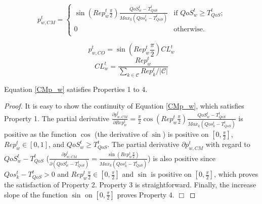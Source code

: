 \begin{equation} \label{CMp_w}
p_{w,CM}^t = \begin{cases}
\sin(Rep^t_w\frac{\pi}{2})\frac{QoS_w^t-T_{QoS}^t}{Max_k(Qos_k^t-T_{QoS}^t)} & \text{if $QoS_w^t\geq T_{QoS}^t$;}\\
0 & \text{otherwise.}\\
\end{cases}
\end{equation}

\begin{equation}\label{CLp_w}
p_{w,CO}^t=\sin(Rep^t_w\frac{\pi}{2})CL_w^t
\end{equation}
\begin{equation*}
CL_w^t=\frac{Rep^t_w}{\sum_{k\in
\mathcal{C}}Rep^t_k/|\mathcal{C}|}
\end{equation*}

\begin{theorem}
Equation  \ref{CMp_w} satisfies Properties 1 to 4.
\end{theorem}

\begin{proof}
It is easy to show the continuity of Equation \ref{CMp_w}, which
satisfies Property 1. The partial derivative $\frac{\partial
p_{w,CM}^t}{\partial Rep^t_w} = \frac{\pi}{2}
\cos(Rep^t_w\frac{\pi}{2})\frac{QoS_w^t-T_{QoS}^t}{Max_k(Qos_k^t-T_{QoS}^t)}$
is positive as the function $\cos$ (the derivative of $\sin$) is
positive on $[0, \frac{\pi}{2}]$, $Rep^t_w \in [0, 1]$, and
$QoS_w^t\geq T_{QoS}^t$. The partial derivative $\partial
p_{w,CM}^t$ with regard to $QoS_w^t - T_{QoS}^t$ ($\frac{\partial
p_{w,CM}^t}{\partial(QoS_w^t - T_{QoS}^t)} =
\frac{\sin(Rep^t_w\frac{\pi}{2})}{Max_k(Qos_k^t-T_{QoS}^t)}$) is
also positive since $Qos_k^t-T_{QoS}^t > 0$ and
$Rep^t_w\frac{\pi}{2} \in [0, \frac{\pi}{2}]$ and $\sin$ is
positive on $[0, \frac{\pi}{2}]$, which proves the satisfaction of
Property 2. Property 3 is straightforward. Finally, the increase
slope of the function $\sin$ on $[0, \frac{\pi}{2}]$ proves
Property 4. $\Box$
\end{proof}

